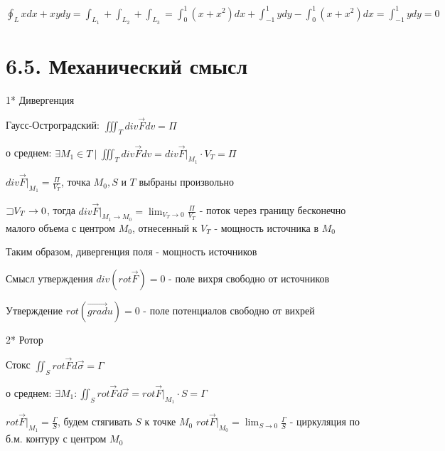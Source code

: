 \documentclass[12pt]{article}
\begin{document}
    $\oint_L xdx + xydy = \int_{L_1} + \int_{L_2} + \int_{L_3} = \int_0^1 (x + x^2) dx + \int_{-1}^1 y dy - \int_0^1 (x + x^2) dx = \int_{-1}^1 y dy = 0$

    \section{6.5. Механический смысл}

    1* Дивергенция

    Гаусс-Остроградский: $\iiint_T div \overrightarrow{F} dv = \Pi$

    \Ths о среднем: $\exists M_1 \in T \ | \ \iiint_T div \overrightarrow{F} dv = div \overrightarrow{F} \Big|_{M_1} \cdot V_T = \Pi$

    $div \overrightarrow{F} \Big|_{M_1} = \frac{\Pi}{V_T}$, точка $M_0, S$ и $T$ выбраны произвольно

    $\mathord{\sqsupset} V_T \to 0$, тогда $div \overrightarrow{F} \Big|_{M_1 \to M_0} = \lim_{V_T \to 0} \frac{\Pi}{V_T}$ - поток через границу бесконечно малого объема с центром $M_0$, отнесенный к $V_T$ - мощность источника в $M_0$

    Таким образом, дивергенция поля - мощность источников

    \Nota Смысл утверждения $div (rot \overrightarrow F) = 0$ - поле вихря свободно от источников

    \Nota Утверждение $rot (\overrightarrow{grad} u) = 0$ - поле потенциалов свободно от вихрей

    \vspace{5mm}

    2* Ротор

    Стокс $\iint_S rot \overrightarrow{F} d\overrightarrow{\sigma} = \Gamma$

    \Ths о среднем: $\exists M_1 : \iint_S rot \overrightarrow{F} d\overrightarrow{\sigma} = rot \overrightarrow{F} \Big|_{M_1} \cdot S = \Gamma$

    $rot \overrightarrow{F} \Big|_{M_1} = \frac{\Gamma}{S}$, будем стягивать $S$ к точке $M_0$ \Longrightarrow $rot \overrightarrow{F} \Big|_{M_0} = \lim_{S \to 0} \frac{\Gamma}{S}$ - циркуляция по б.м. контуру с центром $M_0$
\end{document}
